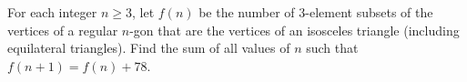 For each integer $n\ge 3$,  let $f(n)$ be the number of 3-element subsets of the vertices of a regular $n$-gon that are the vertices of an isosceles triangle (including equilateral triangles). Find the sum of all values of $n$ such that $f(n+1)=f(n)+78$.